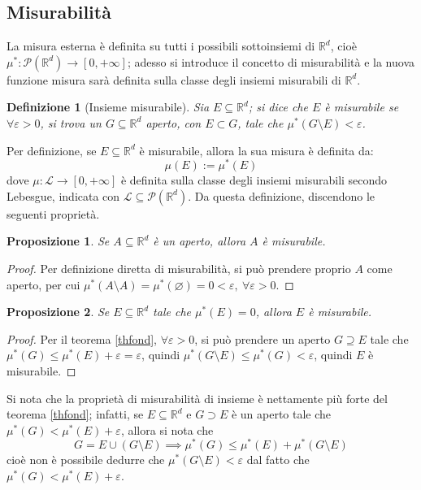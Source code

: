 \documentclass[11pt]{article}
\theoremstyle{style}
\newtheorem{definizione}{Definizione}[section]
\newtheorem{prop}{Proposizione}[section]
\numberwithin{equation}{subsection}
\begin{document}
\subsection{Misurabilit\`a}
La misura esterna \`e definita su tutti i possibili sottoinsiemi di $\mathbb{R}^d$, cio\`e $\mu ^* : \mathcal{P} (\mathbb{R}^d) \to [0,+\infty]$; adesso si introduce il concetto di misurabilit\`a e la nuova funzione misura sar\`a definita sulla classe degli insiemi misurabili di $\mathbb{R}^d$.
\begin{definizione}
	[Insieme misurabile]
	Sia $E \subseteq \mathbb{R}^d$; si dice che $E$ \`e \textit{misurabile} se $\forall \varepsilon >0$, si trova un $G \subseteq \mathbb{R}^d$ aperto, con $E \subset G$, tale che $\mu ^*(G \setminus E) < \varepsilon $.
\end{definizione}
Per definizione, se $E \subseteq \mathbb{R}^d$ \`e misurabile, allora la sua misura \`e definita da:
\[
\mu (E) := \mu ^*(E)
\] 
dove $\mu:\mathscr{L} \to [0,+\infty] $ \`e definita sulla classe degli insiemi misurabili secondo Lebesgue, indicata con $\mathscr{L} \subseteq \mathcal{P} (\mathbb{R}^d)$.
Da questa definizione, discendono le seguenti propriet\`a.
\begin{prop}
	Se $A \subseteq \mathbb{R}^d$ \`e un aperto, allora $A$ \`e misurabile.
\end{prop}
	\begin{proof}
		Per definizione diretta di misurabilit\`a, si pu\`o prendere proprio $A$ come aperto, per cui $\mu ^*(A \setminus A) = \mu ^* (\varnothing)=0 < \varepsilon , \ \forall \varepsilon >0$.
	\end{proof}
\begin{prop}
	Se $E \subseteq \mathbb{R}^d$ tale che $\mu ^*(E) = 0$, allora $E$ \`e misurabile.
\end{prop}
	\begin{proof}
		Per il teorema \ref{thfond}, $\forall \varepsilon >0$, si pu\`o prendere un aperto $G \supseteq E$ tale che $\mu ^*(G) \le \mu ^*(E) + \varepsilon = \varepsilon $, quindi $\mu ^*(G\setminus E) \le \mu ^*(G) < \varepsilon $, quindi $E$ \`e misurabile.
	\end{proof}
Si nota che la propriet\`a di misurabilit\`a di insieme \`e nettamente pi\`u forte del teorema \ref{thfond}; infatti, se $E \subseteq \mathbb{R}^d$ e $G \supset E$ \`e un aperto tale che $\mu ^*(G) < \mu ^*(E) + \varepsilon $, allora si nota che 
\[
G = E \cup (G\setminus E) \implies \mu ^*(G) \le \mu ^*(E) + \mu ^*(G\setminus E)
\] 
cio\`e non \`e possibile dedurre che $\mu ^*(G\setminus E) < \varepsilon $ dal fatto che $\mu ^*(G) <\mu ^*(E) + \varepsilon $.
\end{document}
